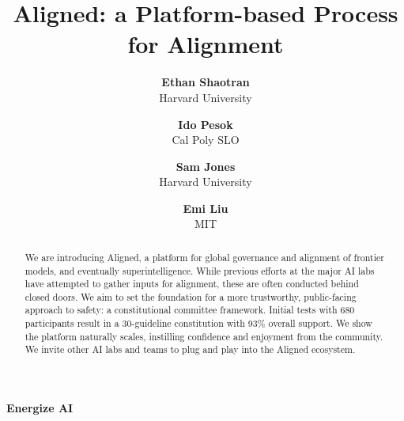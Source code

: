 \documentclass{article}
\date{}
\title{\textbf{Aligned: a Platform-based Process for Alignment}}
\author{
    \textbf{\normalsize Ethan Shaotran}\correspondingauthor \\
    {\normalsize Harvard University} \and
    \textbf{\normalsize Ido Pesok}\footnotemark[1] \\
    {\normalsize Cal Poly SLO} \and 
    \textbf{\normalsize Sam Jones} \\
    {\normalsize Harvard University} \and 
    \textbf{\normalsize Emi Liu} \\
    {\normalsize MIT}
}
\begin{document}
\maketitle
\vspace{-20mm}
\begin{center}
    {\normalsize \textbf{Energize AI}}
\end{center}


\begin{abstract}
We are introducing Aligned, a platform for global governance and alignment of frontier models, and eventually superintelligence. While previous efforts at the major AI labs have attempted to gather inputs for alignment, these are often conducted behind closed doors. We aim to set the foundation for a more trustworthy, public-facing approach to safety: a constitutional committee framework. Initial tests with 680 participants result in a 30-guideline constitution with 93\% overall support. We show the platform naturally scales, instilling confidence and enjoyment from the community. We invite other AI labs and teams to plug and play into the Aligned ecosystem.
\end{abstract}

\vspace{0.5cm}
\end{document}
